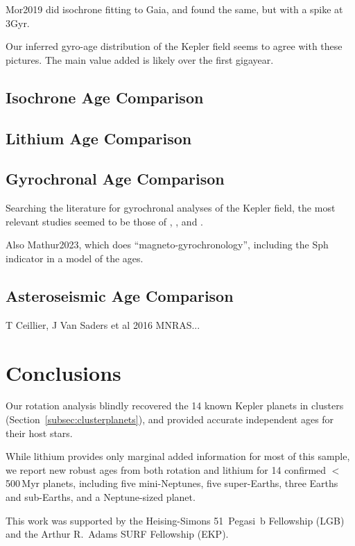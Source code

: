 \documentclass[11pt,twocolumn,tighten]{aastex63}
\begin{document}
Mor2019 did isochrone fitting to Gaia, and found the same, but with a
spike at 3Gyr.

Our inferred gyro-age distribution of the Kepler field seems to agree
with these pictures.  The main value added is likely over the first
gigayear.

\subsection{Isochrone Age Comparison}

\subsection{Lithium Age Comparison}

\subsection{Gyrochronal Age Comparison}
Searching the literature for gyrochronal analyses of the Kepler field,
the most relevant studies seemed to be those of
\citet{Walkowicz_2013}, \citet{Reinhold_2015}, and 
\citet{David_2021}.

Also Mathur2023, which does ``magneto-gyrochronology'', including the
Sph indicator in a model of the ages.


\subsection{Asteroseismic Age Comparison}
T Ceillier, J Van Saders et al 2016 MNRAS...


\section{Conclusions}
\label{sec:conclusions}

Our rotation analysis blindly recovered the 14 known Kepler planets in
clusters (Section~\ref{subsec:clusterplanets}), and provided accurate
independent ages for their host stars.

While lithium provides only marginal added information for most of
this sample, we report new robust ages from both rotation and
lithium for 14 confirmed $<$500\,Myr planets, including five
mini-Neptunes, five super-Earths, three Earths and sub-Earths, and a
Neptune-sized planet.




\acknowledgements
This work was supported by the 
Heising-Simons 51~Pegasi~b Fellowship (LGB)
and the Arthur R.~Adams SURF Fellowship (EKP).
\end{document}
